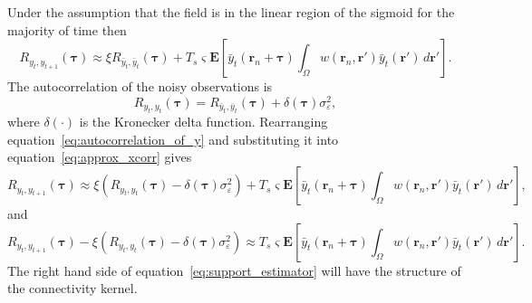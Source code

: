 \documentclass[review,authoryear,3p]{elsarticle}
\begin{document}
Under the assumption that the field is in the linear region of the sigmoid for the majority of time then
\begin{equation}\label{eq:approx_xcorr}
	R_{y_{t},y_{t+1}}(\boldsymbol{\tau}) \approx \xi R_{  \bar{y}_{t},\bar{y}_{t} } (\boldsymbol{\tau}) + T_s\varsigma\mathbf{E}\left[ \bar{y}_t\left( \mathbf{r}_n + \boldsymbol{\tau} \right) \int_{\Omega}{ w\left(\mathbf{r}_n,\mathbf{r}'\right) \bar{y}_t\left( \mathbf{r}' \right)\, d\mathbf{r}'}\right].
\end{equation}
The autocorrelation of the noisy observations is
\begin{equation}\label{eq:autocorrelation_of_y}
	R_{y_{t},y_{t}}(\boldsymbol{\tau}) = R_{\bar{y}_{t},\bar{y}_{t} } (\boldsymbol{\tau}) + \delta(\boldsymbol{\tau})\sigma_{\varepsilon}^2,
\end{equation}
where $\delta(\cdot)$ is the Kronecker delta function. Rearranging equation~\ref{eq:autocorrelation_of_y} and substituting it into equation~\ref{eq:approx_xcorr} gives
\begin{equation}
	R_{y_{t},y_{t+1}}(\boldsymbol{\tau}) \approx \xi (R_{y_{t},y_{t}}(\boldsymbol{\tau}) - \delta(\boldsymbol{\tau}) \sigma_{\varepsilon}^2) + T_s\varsigma\mathbf{E}\left[ \bar{y}_t\left( \mathbf{r}_n + \boldsymbol{\tau} \right) \int_{\Omega}{ w\left(\mathbf{r}_n,\mathbf{r}'\right) \bar{y}_t\left( \mathbf{r}' \right)\, d\mathbf{r}'}\right],	
\end{equation}
and
\begin{equation}\label{eq:support_estimator}
	R_{y_{t},y_{t+1}}(\boldsymbol{\tau}) - \xi (R_{y_{t},y_{t}}(\boldsymbol{\tau}) - \delta(\boldsymbol{\tau}) \sigma_{\varepsilon}^2) \approx T_s\varsigma\mathbf{E}\left[ \bar{y}_t\left( \mathbf{r}_n + \boldsymbol{\tau} \right) \int_{\Omega}{ w\left(\mathbf{r}_n,\mathbf{r}'\right) \bar{y}_t\left( \mathbf{r}' \right)\, d\mathbf{r}'}\right].	
\end{equation}
The right hand side of equation~\ref{eq:support_estimator} will have the structure of the connectivity kernel. 
\end{document}

